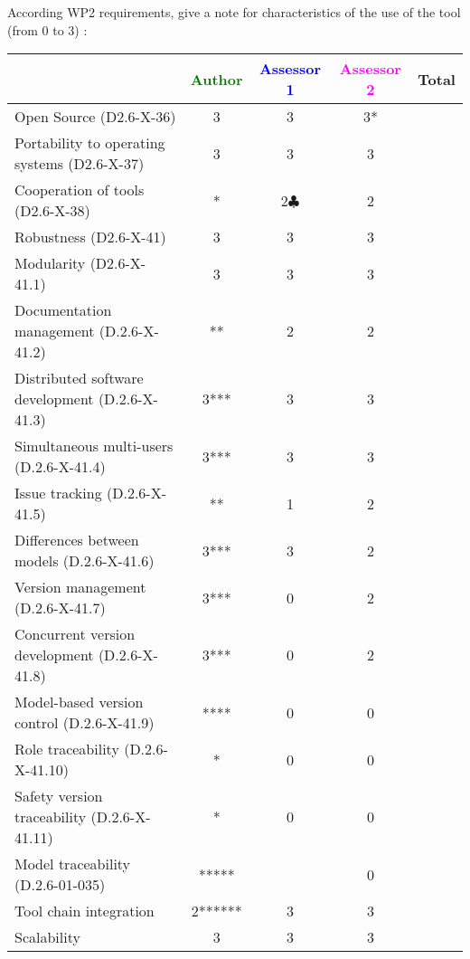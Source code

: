 According WP2 requirements, give a note for characteristics of the use of the tool (from 0 to 3) :

\begin{tabular}{|l | c | c | c | c|}
\hline
& \textcolor{green}{Author} & \textcolor{blue}{Assessor 1} & \textcolor{magenta}{Assessor 2} & Total \\
\hline
Open Source (D2.6-X-36) &3 &3 &3* & \\
\hline
Portability to operating systems (D2.6-X-37) &3 &3 &3 & \\
\hline
Cooperation of tools (D2.6-X-38) &* &2$\clubsuit$ &2 & \\
\hline
Robustness (D2.6-X-41) &3 &3 &3 & \\
\hline
Modularity (D2.6-X-41.1) &3 &3 &3 & \\
\hline
Documentation management (D.2.6-X-41.2) &** &2 &2 & \\
\hline
Distributed software development (D.2.6-X-41.3) &3*** &3 &3 & \\
\hline
Simultaneous multi-users (D.2.6-X-41.4) &3*** & 3&3 & \\
\hline
Issue tracking (D.2.6-X-41.5) &** &1 &2 & \\
\hline
Differences between models (D.2.6-X-41.6) &3*** &3 &2 & \\
\hline
Version management (D.2.6-X-41.7) &3*** &0 &2 & \\
\hline
Concurrent version development (D.2.6-X-41.8) &3*** &0 &2 & \\
\hline
Model-based version control (D.2.6-X-41.9) &**** &0 &0 & \\
\hline
Role traceability (D.2.6-X-41.10) &* &0 &0 & \\
\hline
Safety version traceability (D.2.6-X-41.11) &* &0 &0 & \\
\hline
Model traceability (D.2.6-01-035) &***** & &0 & \\
\hline
Tool chain integration &2****** &3 &3 & \\
\hline
Scalability &3 &3 &3 & \\
\hline
\end{tabular}

